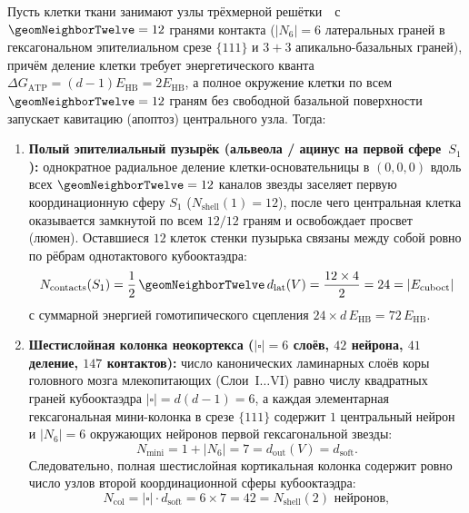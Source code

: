 \begin{theorem}
\label{thm:bio-organogenesis-invariants}
Пусть клетки ткани занимают узлы трёхмерной решётки~\latGCK\ с $\geomNeighborTwelve = 12$ гранями контакта ($|N_6| = 6$ латеральных граней в гексагональном эпителиальном срезе $\{111\}$ и $3 + 3$ апикально-базальных граней), причём деление клетки требует энергетического кванта $\Delta G_{\mathrm{ATP}} = (d-1)E_{\mathrm{HB}} = 2E_{\mathrm{HB}}$, а полное окружение клетки по всем $\geomNeighborTwelve = 12$ граням без свободной базальной поверхности запускает кавитацию (апоптоз) центрального узла. Тогда:
\begin{enumerate}[leftmargin=*]
\item \textbf{Полый эпителиальный пузырёк (альвеола / ацинус на первой сфере~$S_1$):}
  однократное радиальное деление клетки-основательницы в $(0,0,0)$ вдоль всех $\geomNeighborTwelve = 12$ каналов звезды заселяет первую координационную сферу $S_1$ ($N_{\mathrm{shell}}(1) = 12$), после чего центральная клетка оказывается замкнутой по всем $12/12$ граням и освобождает просвет (люмен).
  Оставшиеся $12$ клеток стенки пузырька связаны между собой ровно по рёбрам однотактового кубооктаэдра:
  \begin{equation}
  \label{eq:bio-vesicle-24-contacts}
    N_{\mathrm{contacts}}(S_1) = \frac{1}{2}\,\geomNeighborTwelve\,d_{\mathrm{lat}}(V) = \frac{12\times 4}{2} = 24 = |E_{\mathrm{cuboct}}|
  \end{equation}
  с суммарной энергией гомотипического сцепления $24\times d\,E_{\mathrm{HB}} = 72\,E_{\mathrm{HB}}$.
\item \textbf{Шестислойная колонка неокортекса ($|\square| = 6$ слоёв, $42$ нейрона, $41$ деление, $147$ контактов):}
  число канонических ламинарных слоёв коры головного мозга млекопитающих (Слои~$\mathrm{I\ldots VI}$) равно числу квадратных граней кубооктаэдра $|\square| = d(d-1) = 6$, а каждая элементарная гексагональная мини-колонка в срезе $\{111\}$ содержит $1$ центральный нейрон и $|N_6| = 6$ окружающих нейронов первой гексагональной звезды:
  \[
    N_{\mathrm{mini}} = 1 + |N_6| = 7 = d_{\mathrm{out}}(V) = d_{\mathrm{soft}}.
  \]
  Следовательно, полная шестислойная кортикальная колонка содержит ровно число узлов второй координационной сферы кубооктаэдра:
  \begin{equation}
  \label{eq:bio-cortex-42-neurons}
    N_{\mathrm{col}} = |\square|\cdot d_{\mathrm{soft}} = 6 \times 7 = 42 = N_{\mathrm{shell}}(2)\text{ нейронов},

\end{equation}
\end{enumerate}
\end{theorem}
